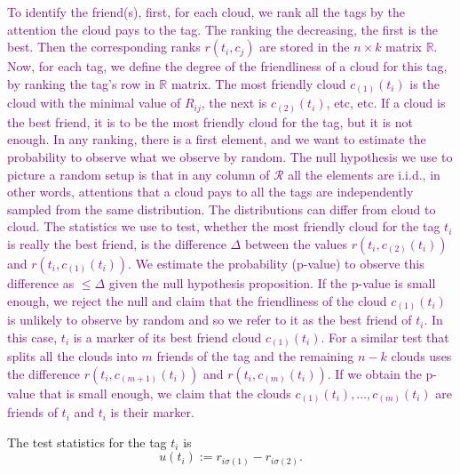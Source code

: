 \documentclass{llncs}
\begin{document}

\textcolor{purple}{
 To identify the friend(s), first, for each cloud, we rank all the tags by the attention the cloud pays to the tag. The ranking the decreasing, the first is the best. Then the corresponding ranks $r(t_i,c_j)$ are stored in the $n\times k$ matrix $\mathbb{R}$. Now, for each tag, we define the degree of the friendliness of a cloud for this tag, by ranking the tag's row in $\mathbb{R}$ matrix. The most friendly cloud $c_{(1)}(t_i)$ is the cloud with the minimal value of $R_{ij}$, the next is $c_{(2)}(t_i)$, etc, etc. 
If a cloud is the best friend, it is to be the most friendly cloud for the tag, but it is not enough. In any ranking, there is a first element, and we want to estimate the probability to observe what we observe by random. The null hypothesis we use to picture a random setup is that in any column of $\mathcal{R}$ all the elements are i.i.d., in other words, attentions that a cloud pays to all the tags are independently sampled from the same distribution. The distributions can differ from cloud to cloud. 
The statistics we use to test, whether the most friendly cloud for the tag $t_i$ is really the best friend, is the difference $\Delta$ between the values $r(t_i,c_{(2)}(t_i))$ and $r(t_i,c_{(1)}(t_i))$. We estimate the probability (p-value) to observe this difference as $\leq \Delta$ given the null hypothesis proposition. If the p-value is small enough, we reject the null and claim that the friendliness of the cloud $c_{(1)}(t_i)$ is unlikely to observe by random and so we refer to it as the best friend of $t_i$. In this case, $t_i$ is a marker of its best friend cloud $c_{(1)}(t_i)$.
For a similar test that splits all the clouds into $m$ friends of the tag and the remaining $n-k$ clouds uses the difference  $r(t_i,c_{(m+1)}(t_i))$ and $r(t_i,c_{(m)}(t_i))$. If we obtain the p-value that is small enough, we claim that the clouds $c_{(1)}(t_i), \dots, c_{(m)}(t_i)$ are friends of $t_i$ and $t_i$ is their marker.}

The test statistics for the tag $t_i$ is
\[
u(t_i) := r_{i\sigma(1)} -  r_{i\sigma(2)}.
\]



\end{document}
